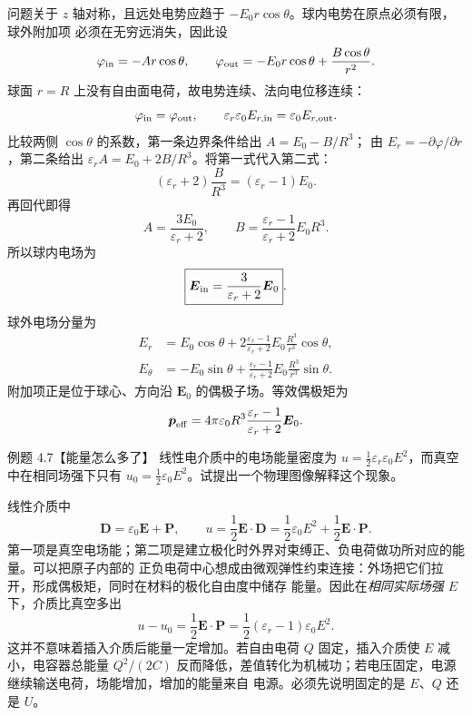 \begin{xesolution}
问题关于 $z$ 轴对称，且远处电势应趋于 $-E_0r\cos\theta$。球内电势在原点必须有限，球外附加项
必须在无穷远消失，因此设
\[
 \varphi_{\rm in}=-Ar\cos\theta,
 \qquad
 \varphi_{\rm out}=-E_0r\cos\theta+\frac{B\cos\theta}{r^2}.
\]
球面 $r=R$ 上没有自由面电荷，故电势连续、法向电位移连续：
\[
 \varphi_{\rm in}=\varphi_{\rm out},\qquad
 \varepsilon_r\varepsilon_0E_{r,\rm in}=\varepsilon_0E_{r,\rm out}.
\]
比较两侧 $\cos\theta$ 的系数，第一条边界条件给出 $A=E_0-B/R^3$；
由 $E_r=-\partial\varphi/\partial r$，第二条给出
$\varepsilon_r A=E_0+2B/R^3$。将第一式代入第二式：
\[
 (\varepsilon_r+2)\frac B{R^3}=(\varepsilon_r-1)E_0.
\]
再回代即得
\[
 A=\frac{3E_0}{\varepsilon_r+2},\qquad
 B=\frac{\varepsilon_r-1}{\varepsilon_r+2}E_0R^3.
\]
所以球内电场为
\[
 \boxed{\boldsymbol E_{\rm in}=\frac{3}{\varepsilon_r+2}\boldsymbol E_0}.
\]
球外电场分量为
\[
 \boxed{\begin{aligned}
 E_r&=E_0\cos\theta+
 2\frac{\varepsilon_r-1}{\varepsilon_r+2}E_0\frac{R^3}{r^3}\cos\theta,\\
 E_\theta&=-E_0\sin\theta+
 \frac{\varepsilon_r-1}{\varepsilon_r+2}E_0\frac{R^3}{r^3}\sin\theta.
 \end{aligned}}
\]
附加项正是位于球心、方向沿 $\boldsymbol E_0$ 的偶极子场。等效偶极矩为
\[
 \boldsymbol p_{\rm eff}=4\pi\varepsilon_0R^3
 \frac{\varepsilon_r-1}{\varepsilon_r+2}\boldsymbol E_0.
\]
\end{xesolution}

\begin{origexamplebox}{例题 4.7【能量怎么多了】}
线性电介质中的电场能量密度为
$u=\tfrac12\varepsilon_r\varepsilon_0E^2$，而真空中在相同场强下只有
$u_0=\tfrac12\varepsilon_0E^2$。试提出一个物理图像解释这个现象。
\end{origexamplebox}

\polarizationEnergyFigure
{}

\begin{xesolution}
线性介质中
\[
 \boldsymbol D=\varepsilon_0\boldsymbol E+\boldsymbol P,
 \qquad
 u=\frac12\boldsymbol E\cdot\boldsymbol D
 =\frac12\varepsilon_0E^2+\frac12\boldsymbol E\cdot\boldsymbol P.
\]
第一项是真空电场能；第二项是建立极化时外界对束缚正、负电荷做功所对应的能量。可以把原子内部的
正负电荷中心想成由微观弹性约束连接：外场把它们拉开，形成偶极矩，同时在材料的极化自由度中储存
能量。因此在\emph{相同实际场强 $E$} 下，介质比真空多出
\[
 u-u_0=\frac12\boldsymbol E\cdot\boldsymbol P
 =\frac12(\varepsilon_r-1)\varepsilon_0E^2.
\]
这并不意味着插入介质后能量一定增加。若自由电荷 $Q$ 固定，插入介质使 $E$ 减小，电容器总能量
$Q^2/(2C)$ 反而降低，差值转化为机械功；若电压固定，电源继续输送电荷，场能增加，增加的能量来自
电源。必须先说明固定的是 $E$、$Q$ 还是 $U$。
\end{xesolution}

